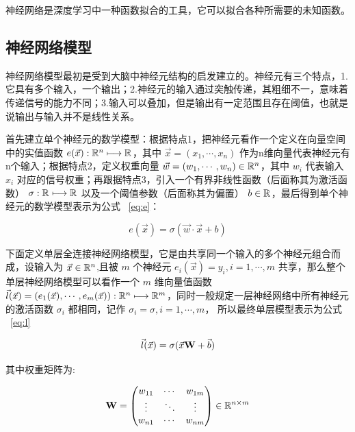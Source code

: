 神经网络是深度学习中一种函数拟合的工具，它可以拟合各种所需要的未知函数。

\subsection{神经网络模型}

神经网络模型最初是受到大脑中神经元结构的启发建立的。神经元有三个特点，1.它具有多个输入，一个输出；2.神经元的输入通过突触传递，其粗细不一，意味着传递信号的能力不同；3.输入可以叠加，但是输出有一定范围且存在阈值，也就是说输出与输入并不是线性关系。

首先建立单个神经元的数学模型：根据特点1，把神经元看作一个定义在向量空间中的实值函数 $ e(\vec{x}):\R[n] \longmapsto \R $，其中 $\vec{x} = (x_1, \cdots, x_n)$ 作为n维向量代表神经元有n个输入；根据特点2，定义权重向量 $\vec{w} = (w_1,\cdots, w_n) \in \R[n]$，其中 $w_i$ 代表输入 $x_i$ 对应的信号权重；再跟据特点3，引入一个有界非线性函数（后面称其为激活函数） $\sigma:\R \longmapsto \R$ 以及一个阈值参数（后面称其为偏置） $b \in \R$，最后得到单个神经元的数学模型表示为公式 ~\eqref{eq:e}：

\begin{equation}\label{eq:e}
    e(\vec{x}) = \sigma(\vec{w} \cdot \vec{x} + b)
\end{equation}

下面定义单层全连接神经网络模型，它是由共享同一个输入的多个神经元组合而成，设输入为 $\vec{x} \in \R[n]$,且被 $m$ 个神经元 $e_i(\vec{x}) = y_i,i=1,\cdots,m$ 共享，那么整个单层神经网络模型可以看作一个 $m$ 维向量值函数 $\vec{l}(\vec{x}) = (e_1(\vec{x}), \cdots, e_m(\vec{x})):\R[n] \longmapsto \R[m]$，同时一般规定一层神经网络中所有神经元的激活函数 $\sigma_i$ 都相同，记作 $\sigma_i = \sigma, i=1, \cdots, m$， 所以最终单层模型表示为公式 ~\eqref{eq:l} 

\begin{equation}\label{eq:l}
    \vec{l}(\vec{x}) = \sigma(\vec{x}\matfmt{W} + \vec{b})
\end{equation}

其中权重矩阵为: 

\newcommand{\Wmat}{
    \begin{pmatrix}  
        w_{1 1} & \cdots & w_{1 m} \\  
        \vdots & \ddots & \vdots \\  
        w_{n 1} & \cdots & w_{n m}  
    \end{pmatrix}
}

\begin{equation*}
    \matfmt{W} = \Wmat \in \R[n \times m]
\end{equation*}

